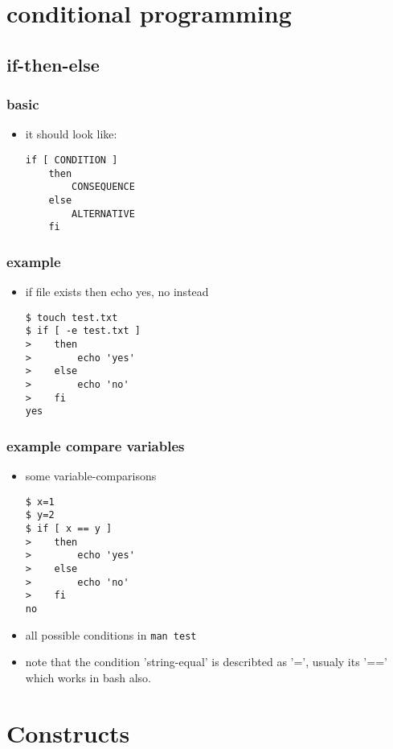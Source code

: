 \documentclass[hyperref={pdfpagelabels=false}]{beamer}
\newcommand{\code}[1]{\colorbox{lGray}{\texttt{#1}}}
\begin{document}
\section{conditional programming}
    \subsection{if-then-else}
		\begin{frame}[fragile]
            \frametitle{basic}
			\begin{itemize}
                \item<1-> it should look like:
                    \begin{verbatim}
if [ CONDITION ]
    then
        CONSEQUENCE
    else
        ALTERNATIVE
    fi
\end{verbatim}
            \end{itemize}
		\end{frame}
		\begin{frame}[fragile]
            \frametitle{example}
			\begin{itemize}
                \item<1-> if file exists then echo yes, no instead
                    \begin{verbatim}
$ touch test.txt
$ if [ -e test.txt ]
>    then
>        echo 'yes'
>    else
>        echo 'no'
>    fi
yes
\end{verbatim}
            \end{itemize}
		\end{frame}
		\begin{frame}[fragile]
            \frametitle{example compare variables}
			\begin{itemize}
                \item<1-> some variable-comparisons
                    \begin{verbatim}
$ x=1
$ y=2
$ if [ x == y ]
>    then
>        echo 'yes'
>    else
>        echo 'no'
>    fi
no
\end{verbatim}
            \item<2-> all possible conditions in \code{man test}
            \item<3-> note that the condition 'string-equal' is describted as '=', usualy its '==' which works in bash also.
            \end{itemize}
		\end{frame}
\section{Constructs}
\end{document}
